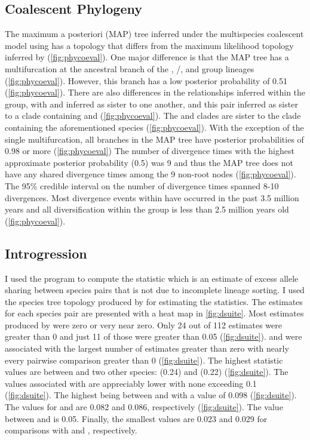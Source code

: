 \subsection{Coalescent Phylogeny}
The maximum a posteriori (MAP) tree inferred under the multispecies coalescent
model using \phycoeval has a topology that differs from the maximum likelihood topology 
inferred by \iqtree (\cref{fig:phycoeval}).
One major difference is that the \phycoeval MAP tree has a multifurcation at the ancestral
branch of the \quercicus, \speciosus/\cognatus, and \amer group lineages (\cref{fig:phycoeval}). 
However, this branch has a low posterior probability of 0.51 (\cref{fig:phycoeval}). 
There are also differences in the relationships inferred within the \amer group,
with \amer and \terr inferred as sister to one another, and this pair inferred as sister 
to a clade containing \wood and \terr (\cref{fig:phycoeval}).  
The \hemiophrys and \baxteri clades are sister to the clade containing the aforementioned
species (\cref{fig:phycoeval}).
With the exception of the single multifurcation, all branches in the MAP tree have 
posterior probabilities of 0.98 or more (\cref{fig:phycoeval})
The number of divergence times with the highest approximate posterior probability
(0.5) was 9 and thus the MAP tree does not have any shared divergence times among the 
9 non-root nodes (\cref{fig:phycoeval}). 
The 95\% credible interval on the number of divergence times spanned 8-10 divergences. 
Most divergence events within \anaxyrus have occurred in the past 3.5 million 
years and all diversification within the \amer group is less than 2.5   
million years old (\cref{fig:phycoeval}).

\subsection{Introgression}
I used the program \dsuite to compute the \fbranch statistic which is an  
estimate of excess allele sharing between species pairs that is not due to 
incomplete lineage sorting. 
I used the species tree topology produced by \phycoeval for estimating 
the \fbranch statistics. 
The \fbranch estimates for each species pair are presented with a heat map in 
\cref{fig:dsuite}.
Most \fbranch estimates produced by \dsuite were zero or very near zero.
Only 24 out of 112 \fbranch estimates were greater than 0 and just 11 of those were 
greater than 0.05 (\cref{fig:dsuite}).
\amer and \wood were associated with the largest number of estimates greater than
zero with nearly every pairwise comparison greater than 0
(\cref{fig:dsuite}). 
The highest \fbranch statistic values are between \amer and two other 
species: \hemiophrys (0.24) and \baxteri (0.22) (\cref{fig:dsuite}).
The values associated with \wood are appreciably lower with none exceeding 
0.1 (\cref{fig:dsuite}).
The highest being between \amer and \wood with a value of 0.098 (\cref{fig:dsuite}).
The \wood \fbranch values for \baxteri and \hemiophrys are 0.082 and 0.086, 
respectively (\cref{fig:dsuite}).
The \fbranch value between \wood and \microscaphus is 0.05.
Finally, the smallest \wood \fbranch values are 0.023 and 0.029 for comparisons 
with \cognatus and \speciosus, respectively.

